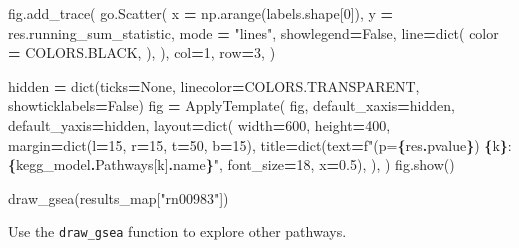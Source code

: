 \documentclass[
]{book}
\newenvironment{Shaded}{\begin{snugshade}}{\end{snugshade}}
\newcommand{\BuiltInTok}[1]{#1}
\newcommand{\DecValTok}[1]{\textcolor[rgb]{0.00,0.00,0.81}{#1}}
\newcommand{\FloatTok}[1]{\textcolor[rgb]{0.00,0.00,0.81}{#1}}
\newcommand{\NormalTok}[1]{#1}
\newcommand{\OperatorTok}[1]{\textcolor[rgb]{0.81,0.36,0.00}{\textbf{#1}}}
\newcommand{\SpecialCharTok}[1]{\textcolor[rgb]{0.81,0.36,0.00}{\textbf{#1}}}
\newcommand{\SpecialStringTok}[1]{\textcolor[rgb]{0.31,0.60,0.02}{#1}}
\newcommand{\StringTok}[1]{\textcolor[rgb]{0.31,0.60,0.02}{#1}}
\newcommand{\VariableTok}[1]{\textcolor[rgb]{0.00,0.00,0.00}{#1}}
\begin{document}
\begin{Shaded}
\begin{Highlighting}[numbers=left,,]
\NormalTok{    fig.add\_trace(}
\NormalTok{        go.Scatter(}
\NormalTok{            x }\OperatorTok{=}\NormalTok{ np.arange(labels.shape[}\DecValTok{0}\NormalTok{]),}
\NormalTok{            y }\OperatorTok{=}\NormalTok{ res.running\_sum\_statistic,}
\NormalTok{            mode }\OperatorTok{=} \StringTok{"lines"}\NormalTok{,}
\NormalTok{            showlegend}\OperatorTok{=}\VariableTok{False}\NormalTok{,}
\NormalTok{            line}\OperatorTok{=}\BuiltInTok{dict}\NormalTok{(}
\NormalTok{                color }\OperatorTok{=}\NormalTok{ COLORS.BLACK,}
\NormalTok{            ),}
\NormalTok{        ),}
\NormalTok{        col}\OperatorTok{=}\DecValTok{1}\NormalTok{, row}\OperatorTok{=}\DecValTok{3}\NormalTok{,}
\NormalTok{    )}

\NormalTok{    hidden }\OperatorTok{=} \BuiltInTok{dict}\NormalTok{(ticks}\OperatorTok{=}\VariableTok{None}\NormalTok{, linecolor}\OperatorTok{=}\NormalTok{COLORS.TRANSPARENT, showticklabels}\OperatorTok{=}\VariableTok{False}\NormalTok{)}
\NormalTok{    fig }\OperatorTok{=}\NormalTok{ ApplyTemplate(}
\NormalTok{        fig,}
\NormalTok{        default\_xaxis}\OperatorTok{=}\NormalTok{hidden,}
\NormalTok{        default\_yaxis}\OperatorTok{=}\NormalTok{hidden,}
\NormalTok{        layout}\OperatorTok{=}\BuiltInTok{dict}\NormalTok{(}
\NormalTok{            width}\OperatorTok{=}\DecValTok{600}\NormalTok{, height}\OperatorTok{=}\DecValTok{400}\NormalTok{,}
\NormalTok{            margin}\OperatorTok{=}\BuiltInTok{dict}\NormalTok{(l}\OperatorTok{=}\DecValTok{15}\NormalTok{, r}\OperatorTok{=}\DecValTok{15}\NormalTok{, t}\OperatorTok{=}\DecValTok{50}\NormalTok{, b}\OperatorTok{=}\DecValTok{15}\NormalTok{),}
\NormalTok{            title}\OperatorTok{=}\BuiltInTok{dict}\NormalTok{(text}\OperatorTok{=}\SpecialStringTok{f"(p=}\SpecialCharTok{\{}\NormalTok{res}\SpecialCharTok{.}\NormalTok{pvalue}\SpecialCharTok{\}}\SpecialStringTok{) }\SpecialCharTok{\{}\NormalTok{k}\SpecialCharTok{\}}\SpecialStringTok{:}\SpecialCharTok{\{}\NormalTok{kegg\_model}\SpecialCharTok{.}\NormalTok{Pathways[k]}\SpecialCharTok{.}\NormalTok{name}\SpecialCharTok{\}}\SpecialStringTok{"}\NormalTok{, font\_size}\OperatorTok{=}\DecValTok{18}\NormalTok{, x}\OperatorTok{=}\FloatTok{0.5}\NormalTok{),}
\NormalTok{        ),}
\NormalTok{    )}
\NormalTok{    fig.show()}

\NormalTok{draw\_gsea(results\_map[}\StringTok{"rn00983"}\NormalTok{])}
\end{Highlighting}
\end{Shaded}

Use the \texttt{draw\_gsea} function to explore other pathways.
\end{document}
